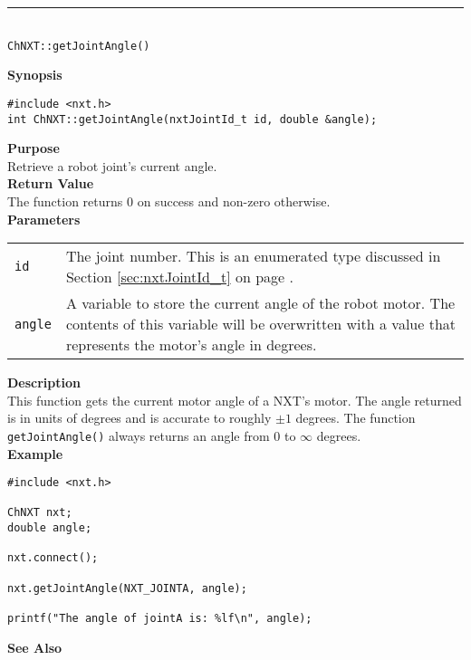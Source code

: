 \noindent
\vspace{5pt}
\rule{4.5in}{0.015in}\\
\noindent
{\LARGE \texttt{ChNXT::getJointAngle()}}\\
{}

\noindent
{\bf Synopsis}
\begin{lstlisting}
#include <nxt.h>
int ChNXT::getJointAngle(nxtJointId_t id, double &angle);
\end{lstlisting}

\noindent
{\bf Purpose}\\
Retrieve a robot joint's current angle.\\

\noindent
{\bf Return Value}\\
The function returns 0 on success and non-zero otherwise.\\

\noindent
{\bf Parameters}\\
\vspace{-0.1in}
\begin{description}
\item               
\begin{tabular}{p{15 mm}p{145 mm}}
\texttt{id} & The joint number. This is an enumerated type 
discussed in Section \ref{sec:nxtJointId_t} on page
\pageref{sec:nxtJointId_t}.\\
\texttt{angle} & A variable to store the current angle of the robot
motor. The contents of this variable will be overwritten with a value that
represents the motor's angle in degrees.  \\
\end{tabular}
\end{description}

\noindent
{\bf Description}\\
This function gets the current motor angle of a NXT's motor. The
angle returned is in units of degrees and is accurate to roughly $\pm1$
degrees. The function \texttt{getJointAngle()} always returns an angle 
from 0 to $\infty$ degrees.\\

\noindent
{\bf Example}
\begin{lstlisting}
#include <nxt.h>

ChNXT nxt;
double angle;

nxt.connect();

nxt.getJointAngle(NXT_JOINTA, angle);

printf("The angle of jointA is: %lf\n", angle);
\end{lstlisting}

\noindent
{\bf See Also}\\

